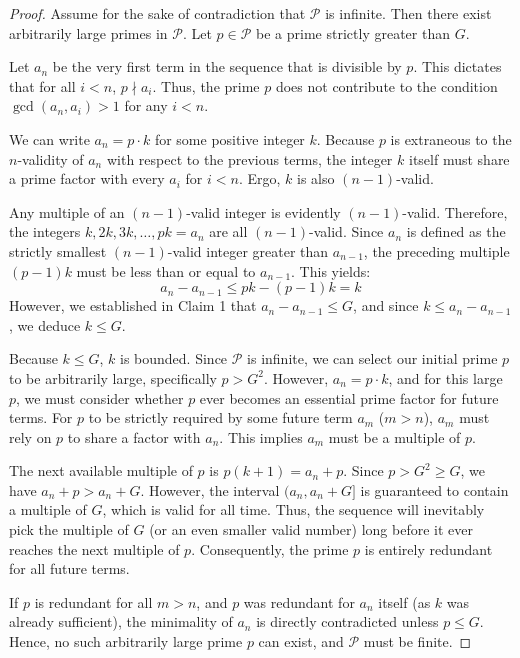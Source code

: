 \documentclass[11pt]{article}
\begin{document}
\begin{proof}
    Assume for the sake of contradiction that $\mathcal{P}$ is infinite. Then there exist arbitrarily large primes in $\mathcal{P}$. Let $p \in \mathcal{P}$ be a prime strictly greater than $G$.

\medskip
Let $a_n$ be the very first term in the sequence that is divisible by $p$. This dictates that for all $i < n$, $p \nmid a_i$. Thus, the prime $p$ does not contribute to the condition $\gcd(a_n, a_i) > 1$ for any $i < n$.

\medskip
We can write $a_n = p \cdot k$ for some positive integer $k$. Because $p$ is extraneous to the $n$-validity of $a_n$ with respect to the previous terms, the integer $k$ itself must share a prime factor with every $a_i$ for $i < n$. Ergo, $k$ is also $(n-1)$-valid.

\medskip
Any multiple of an $(n-1)$-valid integer is evidently $(n-1)$-valid. Therefore, the integers $k, 2k, 3k, \dots, p k = a_n$ are all $(n-1)$-valid. Since $a_n$ is defined as the strictly smallest $(n-1)$-valid integer greater than $a_{n-1}$, the preceding multiple $(p-1)k$ must be less than or equal to $a_{n-1}$. This yields:
$$ a_n - a_{n-1} \leqslant p k - (p-1)k = k $$However, we established in Claim 1 that $a_n - a_{n-1} \leqslant G$, and since $k \leqslant a_n - a_{n-1}$, we deduce $k \leqslant G$.

\medskip
Because $k \leqslant G$, $k$ is bounded. Since $\mathcal{P}$ is infinite, we can select our initial prime $p$ to be arbitrarily large, specifically $p > G^2$. However, $a_n = p \cdot k$, and for this large $p$, we must consider whether $p$ ever becomes an essential prime factor for future terms. For $p$ to be strictly required by some future term $a_m$ ($\displaystyle m > n$), $a_m$ must rely on $p$ to share a factor with $a_n$. This implies $a_m$ must be a multiple of $p$.

\medskip
The next available multiple of $p$ is $p(k+1) = a_n + p$. Since $p > G^2 \geqslant G$, we have $a_n + p > a_n + G$. However, the interval $(a_n, a_n + G]$ is guaranteed to contain a multiple of $G$, which is valid for all time. Thus, the sequence will inevitably pick the multiple of $G$ (or an even smaller valid number) long before it ever reaches the next multiple of $p$. Consequently, the prime $p$ is entirely redundant for all future terms.

\medskip
If $p$ is redundant for all $\displaystyle m > n$, and $p$ was redundant for $a_n$ itself (as $k$ was already sufficient), the minimality of $a_n$ is directly contradicted unless $p \leqslant G$. Hence, no such arbitrarily large prime $p$ can exist, and $\mathcal{P}$ must be finite. 
\end{proof}
\end{document}
